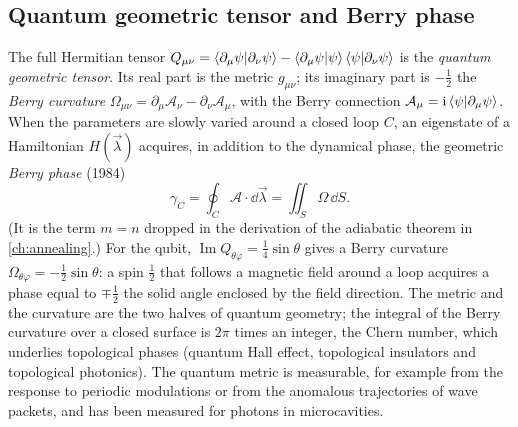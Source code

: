 \subsection{Quantum geometric tensor and Berry phase}
The full Hermitian tensor $Q_{\mu\nu}=\left\langle\partial_\mu\psi\middle|\partial_\nu\psi\right\rangle-\left\langle\partial_\mu\psi\middle|\psi\right\rangle\left\langle\psi\middle|\partial_\nu\psi\right\rangle$ is the \emph{quantum geometric tensor}. Its real part is the metric $g_{\mu\nu}$; its imaginary part is
$-\frac12$ the \emph{Berry curvature} $\Omega_{\mu\nu}=\partial_\mu\mathcal A_\nu-\partial_\nu\mathcal A_\mu$, with the Berry connection $\mathcal A_\mu=\mathrm i\left\langle\psi\middle|\partial_\mu\psi\right\rangle$. When the parameters are slowly varied around a closed loop $C$, an eigenstate of a
Hamiltonian $H(\vec\lambda)$ acquires, in addition to the dynamical phase, the geometric \emph{Berry phase} (1984)
\begin{equation}
  \gamma_C=\oint_C\mathcal A\cdot\dd\vec\lambda=\iint_S\Omega\,\dd S .
\end{equation}
(It is the term $m=n$ dropped in the derivation of the adiabatic theorem in \cref{ch:annealing}.) For the qubit, $\operatorname{Im}Q_{\theta\varphi}=\frac14\sin\theta$ gives a Berry curvature $\Omega_{\theta\varphi}=-\frac12\sin\theta$: a spin $\frac12$ that follows a magnetic
field around a loop acquires a phase equal to $\mp\frac12$ the solid angle enclosed by the field direction. The metric and the curvature are the two halves of quantum geometry; the integral of the Berry curvature over a closed surface is $2\pi$ times an
integer, the Chern number, which underlies topological phases (quantum Hall effect, topological insulators and topological photonics). The quantum metric is measurable, for example from the response to periodic modulations or from the
anomalous trajectories of wave packets, and has been measured for photons in microcavities.

